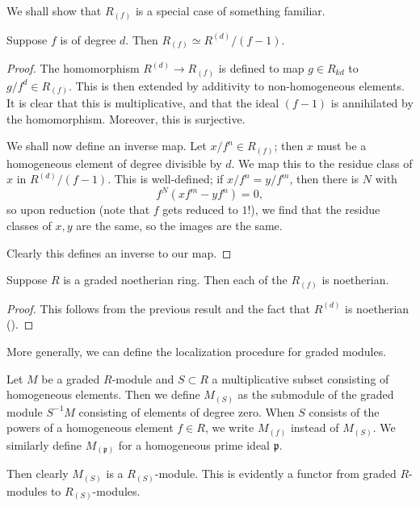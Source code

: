 We shall show that $R_{(f)}$ is a special case of something familiar.

\begin{proposition} \label{loc interpret as quotient ring}
Suppose $f$ is of degree $d$. Then $R_{(f)} \simeq R^{(d)}/(f-1)$.
\end{proposition} 
\begin{proof} 
The homomorphism $R^{(d)} \to R_{(f)}$ is defined to map $g \in R_{kd}$ to
$g/f^d \in
R_{(f)}$.  This is then extended by additivity to non-homogeneous elements. It
is clear that this is multiplicative, and that the ideal $(f-1)$ is annihilated
by the homomorphism.
Moreover, this is surjective.

We shall now define an inverse map. Let $x/f^n \in R_{(f)}$; then $x$ must be
a homogeneous element of degree divisible by $d$. We map this to
the residue class of $x$ in $R^{(d)}/(f-1)$.  This is well-defined; if $x/f^n =
y/f^m$, then there is $N$ with
\[ f^N( xf^m - yf^n) = 0,  \]
so upon reduction (note that $f$ gets reduced to $1$!), we find that the
residue classes of $x,y$ are the same, so the images are the same.

Clearly this defines an inverse to our map.
\end{proof} 

\begin{corollary} 
Suppose $R$ is a graded noetherian ring. Then each of the $R_{(f)}$ is
noetherian.
\end{corollary} 
\begin{proof} 
This follows from the previous result and the fact that $R^{(d)}$ is noetherian
().\end{proof} 

More generally, we can define the localization procedure for graded modules.
\begin{definition} 
Let $M$ be a graded $R$-module and $S \subset R$ a multiplicative subset
consisting of homogeneous elements. Then we define $M_{(S)}$ as the submodule
of the graded module $S^{-1}M$ consisting of elements of degree zero. When $S$
consists of the powers of a homogeneous element $f \in R$, we write $M_{(f)}$
instead of $M_{(S)}$. We similarly define $M_{(\mathfrak{p})}$ for a
homogeneous prime ideal $\mathfrak{p}$.
\end{definition} 

Then clearly $M_{(S)}$ is a $R_{(S)}$-module. This is evidently a functor from
graded $R$-modules to $R_{(S)}$-modules.

